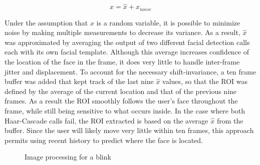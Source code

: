 \documentclass{acm_proc_article-sp}
\begin{document}
 \[ x = \hat{x} + x_{noise} \]

Under the assumption that $x$ is a random variable, it is possible to
minimize noise by making multiple measurements to decrease its
variance. As a result, $\hat{x}$ was approximated by averaging the
output of two different facial detection calls each with its own
facial template. Although this average increases confidence of the
location of the face in the frame, it does very little to handle
inter-frame jitter and displacement. To account for the necessary
shift-invariance, a ten frame buffer was added that kept track of the
last nine $\hat{x}$ values, so that the ROI was defined by the average of
the current location and that of the previous nine frames. As a
result the ROI smoothly follows the user's face throughout the frame,
while still being sensitive to what occurs inside. In the case where
both Haar-Cascade\cite{haar} calls fail, the ROI extracted is based on the
average $\hat{x}$ from the buffer.  Since the user will likely move
very little within ten frames, this approach permits using recent
history to predict where the face is located.

\begin{figure}
  \hfill
  \caption{Image processing for a blink}\label{fig:RawGrid}
\end{figure}
\end{document}
